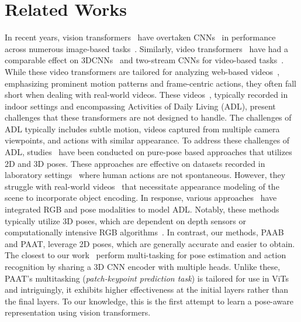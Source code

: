 \documentclass{article}
\begin{document}
\section{Related Works}
\vspace{-0.05in}
In recent years, vision transformers~\cite{dosovitskiy2020vit, liu2021swin, deit, t2t, tnt, crossvit} have overtaken CNNs~\cite{resnet, vgg16, szegedy2016inception} in performance across numerous image-based tasks~\cite{dosovitskiy2020vit, carion2020detr, strudel2021segmenter}. Similarly, video transformers~\cite{timesformer, liu2021videoswin, vivit, motionformerNeurIPS21, mvit1, mvit2}  have had a comparable effect on 3DCNNs~\cite{x3d, lin2019tsm, i3d, C3D} and two-stream CNNs for video-based tasks~\cite{twostream, twostreamfusion, slow_fast}.
While these video transformers are tailored for analyzing web-based videos~\cite{kinetics, ucf, kuehne2011hmdb, AVA}, emphasizing prominent motion patterns and frame-centric actions, they often fall short when dealing with real-world videos. These videos~\cite{MSRDailyactivity3D, CAD-60, CAD-120, ntu120, NTU_RGB+D, smarthome, DML-smartactions, charades}, typically recorded in indoor settings and encompassing Activities of Daily Living (ADL), present challenges that these transformers are not designed to handle. The challenges of ADL typically includes subtle motion, videos captured from multiple camera viewpoints, and actions with similar appearance.
To address these challenges of ADL, studies~\cite{stgcn, msaagcn, hyunggun2022cvpr_infogcn, hachiuma2023unifiedskele} have been conducted on pure-pose based approaches that utilizes 2D and 3D poses. These approaches are effective on datasets recorded in laboratory settings~\cite{NTU_RGB+D, ntu120, nucla} where human actions are not spontaneous. However, they struggle with real-world videos~\cite{vpn++, smarthome} that necessitate appearance modeling of the scene to incorporate object encoding. In response, various approaches~\cite{smarthome, das2020vpn, vpn++, STA_hands, glimpse} have integrated RGB and pose modalities to model ADL. Notably, these methods typically utilize 3D poses, which are dependent on depth sensors or computationally intensive RGB algorithms~\cite{lcrnet_new, videopose3d}. 
In contrast, our methods, PAAB and PAAT, leverage 2D poses, which are generally accurate and easier to obtain.
The closest to our work~\cite{chainedcnn, pose_for_action} perform multi-tasking for pose estimation and action recognition by sharing a 3D CNN encoder with multiple heads. Unlike these, PAAT's multitasking (\textit{patch-keypoint prediction task}) is tailored for use in ViTs and intriguingly, it exhibits higher effectiveness at the initial layers rather than the final layers. To our knowledge, this is the first attempt to learn a pose-aware representation using vision transformers.
\end{document}
